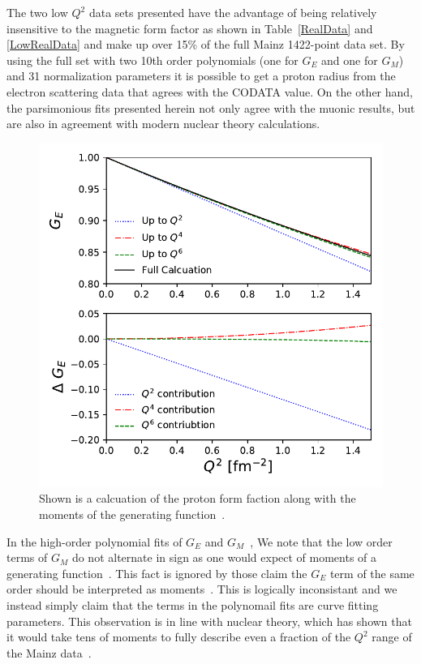 \documentclass[10pt,aps,prc,twocolumn]{revtex4-1}
\begin{document}
The two low $Q^2$ data sets presented have the advantage of being relatively insensitive to the magnetic form 
factor as shown in Table~\ref{RealData} and \ref{LowRealData} and make up over
15\% of the full Mainz 1422-point data set.   By using the full set with two 10th order polynomials
(one for $G_E$ and one for $G_M$) and 31 normalization parameters it is possible to get a proton radius from the electron
scattering data that agrees with the 
CODATA value.     On the other hand,  the parsimonious fits presented herein not only agree with the muonic results, 
but are also in agreement with modern nuclear theory calculations.

\begin{figure}
\includegraphics[width=\columnwidth]{Figure/RealMoments.pdf}
\caption{Shown is a calcuation of the proton form faction along with the moments of the generating 
function~\cite{Alarcon:2017lhg}.}
\end{figure}

In the high-order polynomial fits of $G_E$ and $G_M$~\cite{Sick:2017aor,Sick:2018fzn},
We note that the low order terms of $G_M$ do not alternate in sign as one would expect
of moments of a generating function~\cite{Bernauer:2010zga}.
This fact is ignored by those claim the $G_E$ term of the same order should
be interpreted as moments~\cite{Sick:2017aor,Sick:2018fzn}.   This is logically inconsistant
and we instead simply claim that the terms in the polynomail fits are curve fitting parameters.
This observation is in line with nuclear theory, which has shown 
that it would take tens of moments to fully describe even a fraction of the $Q^2$ 
range of the Mainz data~\cite{Alarcon:2018irp}.
\end{document}
